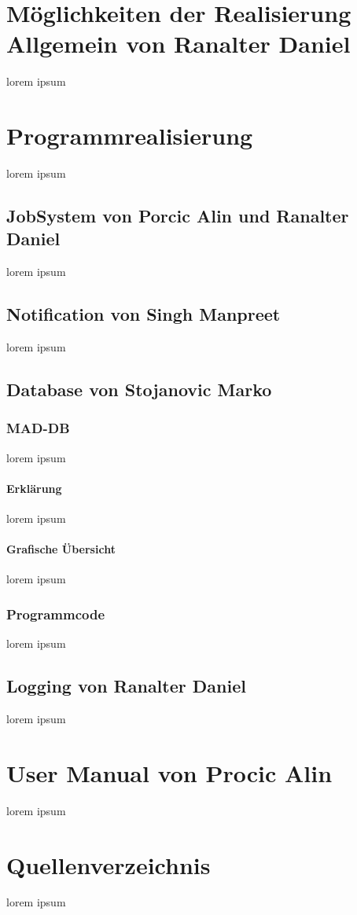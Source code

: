 \documentclass[12pt,a4paper]{report}
\begin{document}
\chapter{Möglichkeiten der Realisierung Allgemein von Ranalter Daniel}
lorem ipsum


\chapter{Programmrealisierung}
lorem ipsum

\section{JobSystem von Porcic Alin und Ranalter Daniel}
lorem ipsum

\section{Notification von Singh Manpreet}
lorem ipsum

\section{Database von Stojanovic Marko}
\subsection{MAD-DB}
lorem ipsum
\subsubsection{Erklärung}
lorem ipsum
\subsubsection{Grafische Übersicht}
lorem ipsum
\subsection{Programmcode}
lorem ipsum

\section{Logging von Ranalter Daniel}
lorem ipsum


\chapter{User Manual von Procic Alin}
lorem ipsum 


\chapter{Quellenverzeichnis}
lorem ipsum 
\end{document}
